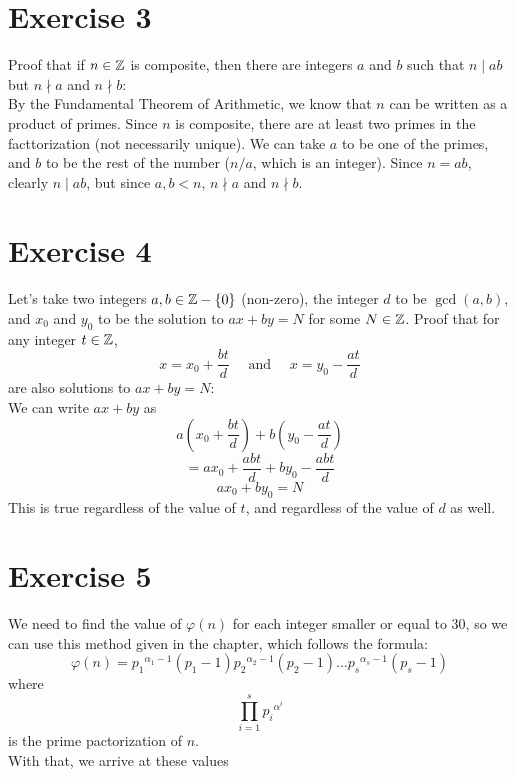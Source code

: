 \documentclass[12pt]{article}
\begin{document}
    \section*{Exercise 3}
    Proof that if $n \in \mathbb{Z}$ is composite,
    then there are integers $a$ and $b$
    such that $n \mid ab$ but $n \nmid a$ and $n \nmid b$: \\
    By the Fundamental Theorem of Arithmetic, 
    we know that $n$ can be written as a product of primes.
    Since $n$ is composite,
    there are at least two primes in the facttorization
    (not necessarily unique).
    We can take $a$ to be one of the primes,
    and $b$ to be the rest of the number ($n/a$, which is an integer).
    Since $n = ab$, clearly $n \mid ab$,
    but since $a, b < n$,
    $n \nmid a$ and $n \nmid b$. \\

    \section*{Exercise 4}
    Let's take two integers $a, b \in \mathbb{Z} - \{0\}$ (non-zero),
    the integer $d$ to be $\gcd(a, b)$,
    and $x_0$ and $y_0$ to be the solution to $ax + by = N$
    for some $N \in \mathbb{Z}$.
    Proof that for any integer $t \in \mathbb{Z}$,
    \[ x = x_0 + \dfrac{bt}{d} 
    \quad \text{ and } \quad
    x = y_0 - \dfrac{at}{d}  \]
    are also solutions to $ax + by = N$: \\
    We can write $ax + by$ as
    \[ a\left( x_0 + \dfrac{bt}{d} \right)
    + b\left( y_0 - \dfrac{at}{d} \right) \]
    \[ = ax_0 + \dfrac{abt}{d}
    + by_0 - \dfrac{abt}{d} \]
    \[ ax_0 + by_0 = N \]
    This is true regardless of the value of $t$,
    and regardless of the value of $d$ as well. \\

    \section*{Exercise 5}
    We need to find the value of $\varphi(n)$
    for each integer smaller or equal to $30$,
    so we can use this method given in the chapter,
    which follows the formula:
    \[ \varphi(n)
    = {p_1}^{\alpha_1 - 1}(p_1 - 1){p_2}^{\alpha_2 - 1}(p_2 - 1)
    \dots {p_s}^{\alpha_s - 1}(p_s - 1) \]
    where
    \[ \prod_{i=1}^s {p_i}^{\alpha^i} \]
    is the prime pactorization of $n$. \\
    With that, we arrive at these values
    
\end{document}
